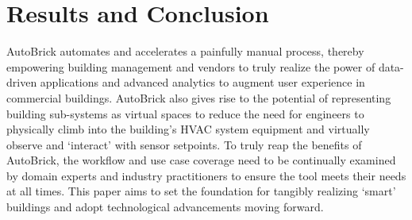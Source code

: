 \documentclass[twocolumn, switch]{article} %
\begin{document}
\section{Results and Conclusion}
AutoBrick automates and accelerates a painfully manual process, thereby
empowering building management and vendors to truly realize the power of
data-driven applications and advanced analytics to augment user experience in
commercial buildings. AutoBrick also gives rise to the potential of
representing building sub-systems as virtual spaces to reduce the need for
engineers to physically climb into the building's HVAC system equipment and virtually observe and ‘interact’ with sensor setpoints. To truly reap the benefits of AutoBrick, the workflow and use case coverage need to be continually examined by domain experts and industry practitioners to ensure the tool meets their needs at all times. This paper aims to set the foundation for tangibly realizing ‘smart’ buildings and adopt technological advancements moving forward.






\end{document}
